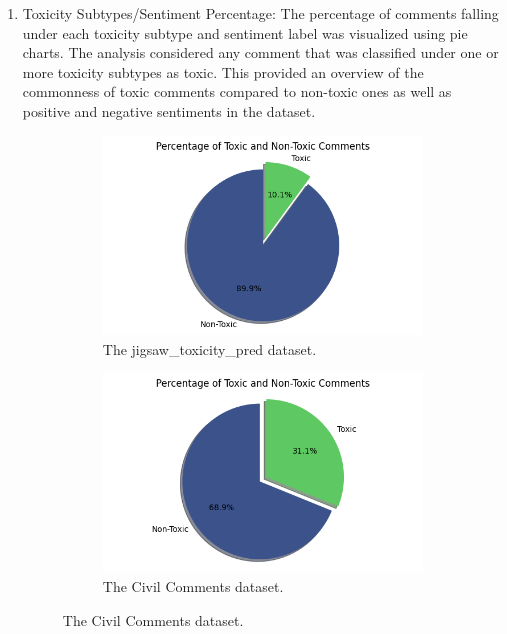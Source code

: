 \documentclass[10pt,a4paper,oneside]{article} %
\begin{document}
\begin{enumerate}
\begin{figure}[h]
\begin{subfigure}{0.49\textwidth}
        \caption{The Jigsaw\_toxicity\_pred dataset.}
        \label{fig:tox_freq_cc}
    \end{subfigure}
    \caption{Toxicity frequency plots.}
    \label{fig:tox_freq_plots}
    \end{figure}
    \item Toxicity Subtypes/Sentiment Percentage: The percentage of comments falling under each toxicity subtype and sentiment label was visualized using pie charts. The analysis considered any comment that was classified under one or more toxicity subtypes as toxic. This provided an overview of the commonness of toxic comments compared to non-toxic ones as well as positive and negative sentiments in the dataset.
    \begin{figure}[h]
    \centering
    \begin{subfigure}{0.5\textwidth}
        \centering
        \includegraphics[width=\textwidth]{replibert/replibert/plots/Toxicity_percentage_Jigsaw.png} 
        \caption{The jigsaw\_toxicity\_pred dataset.}
        \label{fig:tox_percentage_jigsaw}
    \end{subfigure}%
    \hfill
    \begin{subfigure}{0.5\textwidth}
        \centering
        \includegraphics[width=\textwidth]{replibert/replibert/plots/Toxicity_percentage_cc.png} 
        \caption{The Civil Comments dataset.}
        \label{fig:tox_percentage_cc}
    \end{subfigure}


\end{figure}
\end{enumerate}
\end{document}
